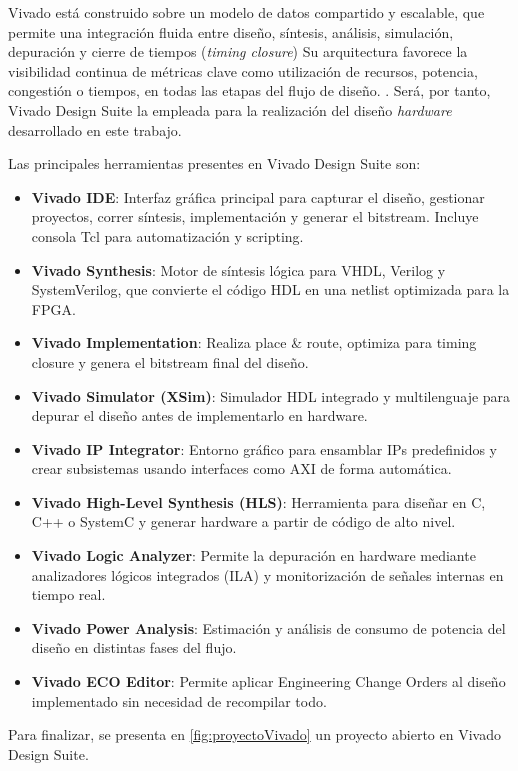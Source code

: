 Vivado está construido sobre un modelo de datos compartido y escalable, que permite una integración fluida entre diseño, síntesis, análisis, simulación, depuración y cierre de tiempos (\textit{timing closure}) Su arquitectura favorece la visibilidad continua de métricas clave como utilización de recursos, potencia, congestión o tiempos, en todas las etapas del flujo de diseño. \cite{vivadoRazones}. Será, por tanto, Vivado Design Suite la empleada para la realización del diseño \textit{hardware} desarrollado en este trabajo.

Las principales herramientas presentes en Vivado Design Suite son:

\begin{itemize}
    \item \textbf{Vivado IDE}: Interfaz gráfica principal para capturar el diseño, gestionar proyectos, correr síntesis, implementación y generar el bitstream. Incluye consola Tcl para automatización y scripting.
    \item \textbf{Vivado Synthesis}: Motor de síntesis lógica para VHDL, Verilog y SystemVerilog, que convierte el código HDL en una netlist optimizada para la FPGA.
    \item \textbf{Vivado Implementation}: Realiza place \& route, optimiza para timing closure y genera el bitstream final del diseño.
    \item \textbf{Vivado Simulator (XSim)}: Simulador HDL integrado y multilenguaje para depurar el diseño antes de implementarlo en hardware.
    \item \textbf{Vivado IP Integrator}: Entorno gráfico para ensamblar IPs predefinidos y crear subsistemas usando interfaces como AXI de forma automática.
    \item \textbf{Vivado High-Level Synthesis (HLS)}: Herramienta para diseñar en C, C++ o SystemC y generar hardware a partir de código de alto nivel.
    \item \textbf{Vivado Logic Analyzer}: Permite la depuración en hardware mediante analizadores lógicos integrados (ILA) y monitorización de señales internas en tiempo real.
    \item \textbf{Vivado Power Analysis}: Estimación y análisis de consumo de potencia del diseño en distintas fases del flujo.
    \item \textbf{Vivado ECO Editor}: Permite aplicar Engineering Change Orders al diseño implementado sin necesidad de recompilar todo.
\end{itemize}

Para finalizar, se presenta en \ref{fig:proyectoVivado} un proyecto abierto en Vivado Design Suite.

